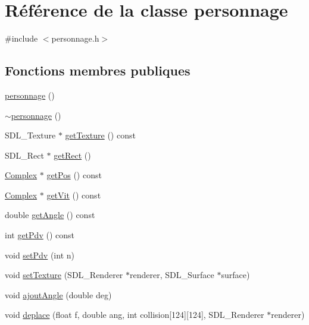 \hypertarget{classpersonnage}{}\section{Référence de la classe personnage}
\label{classpersonnage}


{\ttfamily \#include $<$personnage.\+h$>$}

\subsection*{Fonctions membres publiques}
\begin{DoxyCompactItemize}
\item 
\hyperlink{classpersonnage_acd9ca516f8c5c110687e5167dab8db59}{personnage} ()
\item 
\hyperlink{classpersonnage_a3258008aea95a40b54591ee6bc7129be}{$\sim$personnage} ()
\item 
S\+D\+L\+\_\+\+Texture $\ast$ \hyperlink{classpersonnage_a4945e1194417822b5c50f71418522dc2}{get\+Texture} () const
\item 
S\+D\+L\+\_\+\+Rect $\ast$ \hyperlink{classpersonnage_acc097b6266a023b5c7eb4eef1111378b}{get\+Rect} ()
\item 
\hyperlink{classComplex}{Complex} $\ast$ \hyperlink{classpersonnage_a26182b2cf14bbf5abf25c6fae0ba3e47}{get\+Pos} () const
\item 
\hyperlink{classComplex}{Complex} $\ast$ \hyperlink{classpersonnage_a3c98da8dfc7f5c1dae8cb8fb85726c9f}{get\+Vit} () const
\item 
double \hyperlink{classpersonnage_a7cb609dc21ef3bc8623cb9b670438970}{get\+Angle} () const
\item 
int \hyperlink{classpersonnage_a844ee07a1421658afa75ef307a5646dc}{get\+Pdv} () const
\item 
void \hyperlink{classpersonnage_a8c752b8ff67fc920a3dede6f230bac15}{set\+Pdv} (int n)
\item 
void \hyperlink{classpersonnage_a174d6e33503a0d1566b6be675be5efc1}{set\+Texture} (S\+D\+L\+\_\+\+Renderer $\ast$renderer, S\+D\+L\+\_\+\+Surface $\ast$surface)
\item 
void \hyperlink{classpersonnage_a13eb75d232d184e031ac3407e1313f3d}{ajout\+Angle} (double deg)
\item 
void \hyperlink{classpersonnage_a932b426b05f6a09941eb7a2779ca077b}{deplace} (float f, double ang, int collision\mbox{[}124\mbox{]}\mbox{[}124\mbox{]}, S\+D\+L\+\_\+\+Renderer $\ast$renderer)
\end{DoxyCompactItemize}
